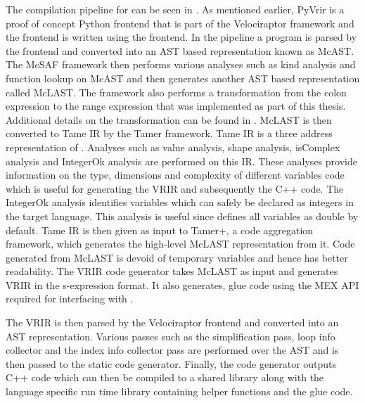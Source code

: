 The compilation pipeline for \velocty can be seen in . As mentioned earlier, PyVrir is a proof of concept Python frontend that is part of the Velociraptor framework and the \matlab frontend is written using the \mclab frontend. In the \mclab pipeline a \matlab program is parsed by the \mclab frontend and converted into an AST based representation known as McAST. The McSAF\cite{doherty11} framework then performs various analyses such as kind analysis\cite{Doherty:2011:KAM:2076021.2048077} and function lookup on McAST and then generates another AST based representation called McLAST. The framework also performs a transformation from the colon expression to the range expression that was implemented as part of this thesis. Additional details on the transformation can be found in . McLAST is then converted to Tame IR\cite{Dubrau:2012} by the Tamer\cite{Dubrau:2012} framework. Tame IR is a three address representation of \matlab. Analyses such as value analysis, shape analysis, isComplex analysis and IntegerOk analysis are performed on this IR. These analyses provide information on the type, dimensions and complexity of different variables code which is useful for generating the VRIR and subsequently the C++ code. The IntegerOk analysis identifies variables which can safely be declared as integers in the target language. This analysis is useful since \matlab defines all variables as double by default. Tame IR is then given as input to Tamer+, a code aggregation framework, which generates the high-level McLAST representation from it. Code generated from McLAST is devoid of temporary variables and hence has better readability. The VRIR code generator takes McLAST as input and generates VRIR in the s-expression format. It also generates, glue code using the \matlab MEX\cite{mex} API required for interfacing with \matlab.

The VRIR is then parsed by the Velociraptor frontend and converted into an AST representation. Various passes such as the simplification pass, loop info collector and the index info collector pass are performed over the AST and is then passed to the static code generator. Finally, the code generator outputs C++ code which can then be compiled to a shared library along with the language specific run time library containing helper functions and the glue code. 
